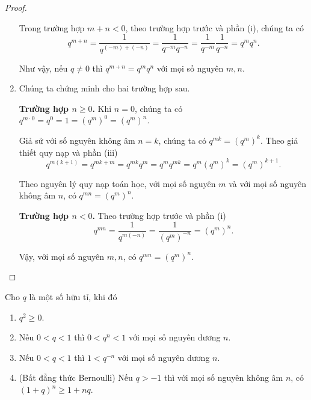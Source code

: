 \begin{proof}
\begin{enumerate}[label={(\roman*)}]
              Trong trường hợp $m + n < 0$, theo trường hợp trước và phần (i), chúng ta có
              \[
                  q^{m+n} = \dfrac{1}{q^{(-m) + (-n)}} = \dfrac{1}{q^{-m}q^{-n}} = \dfrac{1}{q^{-m}}\dfrac{1}{q^{-n}} = q^{m}q^{n}.
              \]

              Như vậy, nếu $q\ne 0$ thì $q^{m + n} = q^{m}q^{n}$ với mọi số nguyên $m, n$.
        \item Chúng ta chứng minh cho hai trường hợp sau.

              \textbf{Trường hợp $n\geq 0$.} Khi $n = 0$, chúng ta có $q^{m\cdot 0} = q^{0} = 1 = {(q^{m})}^{0} = {(q^{m})}^{n}$.

              Giả sử với số nguyên không âm $n = k$, chúng ta có $q^{mk} = {(q^{m})}^{k}$. Theo giả thiết quy nạp và phần (iii)
              \[
                  q^{m(k+1)} = q^{mk + m} = q^{mk}q^{m} = q^{m}q^{mk} = q^{m}{(q^{m})}^{k} = {(q^{m})}^{k+1}.
              \]

              Theo nguyên lý quy nạp toán học, với mọi số nguyên $m$ và với mọi số nguyên không âm $n$, có $q^{mn} = {(q^{m})}^{n}$.

              \textbf{Trường hợp $n < 0$.} Theo trường hợp trước và phần (i)
              \[
                q^{mn} = \frac{1}{q^{m(-n)}} = \frac{1}{{(q^{m})}^{-n}} = {(q^{m})}^{n}.  
              \]

              Vậy, với mọi số nguyên $m, n$, có $q^{mn} = {(q^{m})}^{n}$.
    \end{enumerate}
\end{proof}

\begin{theorem}
    Cho $q$ là một số hữu tỉ, khi đó
    \begin{enumerate}[label={(\roman*)}]
        \item $q^{2}\geq 0$.
        \item Nếu $0 < q < 1$ thì $0 < q^{n} < 1$ với mọi số nguyên dương $n$.
        \item Nếu $0 < q < 1$ thì $1 < q^{-n}$ với mọi số nguyên dương $n$.
        \item (Bất đẳng thức Bernoulli) Nếu $q > -1$ thì với mọi số nguyên không âm $n$, có ${(1 + q)}^{n}\geq 1 + nq$.
    \end{enumerate}
\end{theorem}

